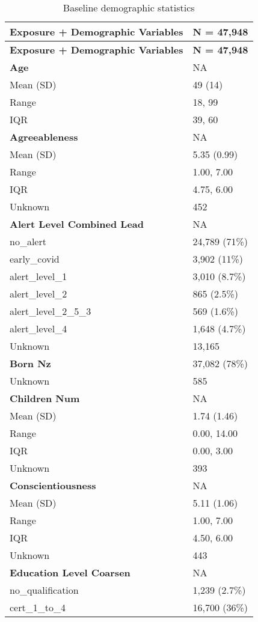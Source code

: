 \documentclass[
  single column]{article}
\begin{document}
\begin{longtable}[]{@{}ll@{}}
\caption{Baseline demographic
statistics}\label{tbl-table-demography}\tabularnewline
\toprule\noalign{}
\textbf{Exposure + Demographic Variables} & \textbf{N = 47,948} \\
\midrule\noalign{}
\endfirsthead
\toprule\noalign{}
\textbf{Exposure + Demographic Variables} & \textbf{N = 47,948} \\
\midrule\noalign{}
\endhead
\bottomrule\noalign{}
\endlastfoot
\textbf{Age} & NA \\
Mean (SD) & 49 (14) \\
Range & 18, 99 \\
IQR & 39, 60 \\
\textbf{Agreeableness} & NA \\
Mean (SD) & 5.35 (0.99) \\
Range & 1.00, 7.00 \\
IQR & 4.75, 6.00 \\
Unknown & 452 \\
\textbf{Alert Level Combined Lead} & NA \\
no\_alert & 24,789 (71\%) \\
early\_covid & 3,902 (11\%) \\
alert\_level\_1 & 3,010 (8.7\%) \\
alert\_level\_2 & 865 (2.5\%) \\
alert\_level\_2\_5\_3 & 569 (1.6\%) \\
alert\_level\_4 & 1,648 (4.7\%) \\
Unknown & 13,165 \\
\textbf{Born Nz} & 37,082 (78\%) \\
Unknown & 585 \\
\textbf{Children Num} & NA \\
Mean (SD) & 1.74 (1.46) \\
Range & 0.00, 14.00 \\
IQR & 0.00, 3.00 \\
Unknown & 393 \\
\textbf{Conscientiousness} & NA \\
Mean (SD) & 5.11 (1.06) \\
Range & 1.00, 7.00 \\
IQR & 4.50, 6.00 \\
Unknown & 443 \\
\textbf{Education Level Coarsen} & NA \\
no\_qualification & 1,239 (2.7\%) \\
cert\_1\_to\_4 & 16,700 (36\%) \\

\end{longtable}
\end{document}
